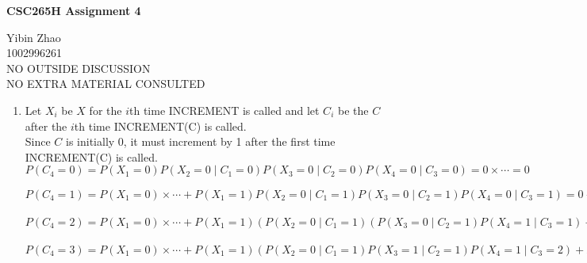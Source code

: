 \documentclass[10pt]{article}
\begin{document}
\begin{center}
{\bf \Large \bf CSC265H Assignment 4} \\
\end{center}

\noindent
Yibin Zhao\\
1002996261\\
NO OUTSIDE DISCUSSION\\
NO EXTRA MATERIAL CONSULTED\\

\begin{comment}
Consider the following algorithm:
INCREMENT(C)
choose X $\in \{0, 1\}$ such that Prob[X=1] = $frac{1}{2^C}$
if X=1 then C $\gets$ C+1
Suppose that C is initially 0.
\end{comment}

\begin{enumerate}

\begin{comment}
1. For each $v \in \{0, 1, 2, 3, 4\}$, what is the probablity that C = v after
INCREMENT(C) has been called 4 times? 
\end{comment}
	\item
		Let $X_i$ be $X$ for the $i$th time INCREMENT is called and let $C_i$ be
		the $C$ after the $i$th time INCREMENT(C) is called. \\
		Since $C$ is initially 0, it must increment by 1 after the first time
		INCREMENT(C) is called. \\
		$P(C_4=0) = P(X_1=0)P(X_2=0 \mid C_1=0)P(X_3=0 \mid C_2=0)P(X_4=0 \mid
		C_3=0) = 0 \times \cdots = 0$

		$P(C_4=1) = P(X_1=0) \times \cdots + P(X_1=1)P(X_2=0 \mid C_1=1)P(X_3=0
		\mid C_2=1)P(X_4=0 \mid C_3=1) = 0 + 1 \times \frac{1}{2^3} =
		\frac{1}{8}$ 

		$P(C_4=2) = P(X_1=0) \times \cdots + P(X_1=1)(P(X_2=0 \mid
		C_1=1)(P(X_3=0 \mid C_2=1)P(X_4=1 \mid C_3=1) + P(X_3=1 \mid
		C_2=1)P(X_4=0 \mid C_3=2)) + P(X_2=1 \mid C_1=1)P(X_3=0 \mid
		C_2=2)P(X_4=0 \mid C_3=2)) = 0 + 1 \times (\frac{1}{2} \times
		(\frac{1}{2} \times \frac{1}{2} + \frac{1}{2} \times \frac{3}{4}) +
		\frac{1}{2} \times \frac{3}{4} \times \frac{3}{4}) = \frac{19}{32}$ 

		$P(C_4=3) = P(X_1=0) \times \cdots + P(X_1=1)(P(X_2=0 \mid
		C_1=1)P(X_3=1 \mid C_2=1)P(X_4=1 \mid C_3=2) + P(X_2=1 \mid
		C_1=1)(P(X_3=1 \mid C_2=2)P(X_4=0 \mid C_3=3) + P(X_3=0 \mid
		C_2=2)P(X_4=1 \mid C_3=2))) = 0 + 1 \times
		(\frac{1}{2} \times \frac{1}{2} \times \frac{1}{4} +
		\frac{1}{2}(\frac{1}{4} \times \frac{7}{8}) + \frac{3}{4} \times
		\frac{1}{4}) = \frac{17}{64}$


\end{enumerate}
\end{document}
